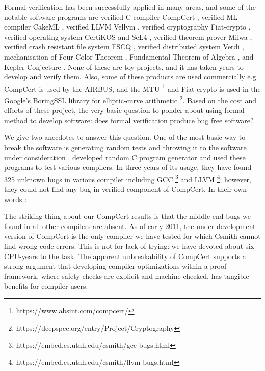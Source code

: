 	Formal verification has been successfully applied in many areas, and 
	some of the notable software programs are 
	verified C compiler CompCert \citep{DBLP:conf/popl/Leroy06}, verified ML compiler
	CakeML \citep{Kumar:2014:CVI}, verified LLVM 
	Vellvm \citep{10.1007/978-3-642-35308-6_6}, verified cryptography 
	Fiat-crypto \citep{DBLP:conf/sp/ErbsenPGSC19}, verified 
	operating system CertiKOS \citep{DBLP:conf/apsys/GuVFSC11} and 
	SeL4 \citep{DBLP:conf/sosp/KleinEHACDEEKNSTW09}, verified theorem 
	prover Milwa \citep{DBLP:conf/itp/MyreenD14}, 
	verified crash resistant file system FSCQ \citep{Chen:2015:UCH:2815400.2815402}, 
	verified distributed system 
	Verdi \citep{DBLP:conf/pldi/WilcoxWPTWEA15}, mechanisation of 
	Four Color Theorem \citep{10.1007/978-3-540-87827-8_28}, 
	Fundamental Theorem of 
	Algebra \citep{10.1007/3-540-45842-5_7}, and Kepler Conjecture \citep{hales-kepler}.
	None of these are toy projects, and it has taken years 
	to develop and verify them. Also, some of these products 
	are used commercially e.g CompCert is used by the AIRBUS, and the MTU
	\footnote{https://www.absint.com/compcert/} and Fiat-crypto is used 
	in the Google's BoringSSL library for elliptic-curve arithmetic 
	\footnote{https://deepspec.org/entry/Project/Cryptography}. 
	Based on the cost and efforts of these project, 
	the very basic question to ponder about using formal method to develop 
	software:  does formal verification produce bug free software?
	
	
	We give two anecdotes to answer this question. 
	One of the most basic way to 
	break the software is generating random tests and throwing it to 
	the software under consideration \citep{Miller:1990:ESR:96267.96279}.
	\citep{Yang:2011:FUB:1993316.1993532} developed random 
	C program generator and used these programs to test various 
	compilers. In three years of its usage, they have found 325 unknown
	bugs in various compiler including GCC
	\footnote{https://embed.cs.utah.edu/csmith/gcc-bugs.html} and LLVM
	\footnote{https://embed.cs.utah.edu/csmith/llvm-bugs.html}; however, 
	they could not find any bug in verified component of CompCert. 
	In their own words \citep{Yang:2011:FUB:1993316.1993532}:
	
	\begin{displayquote}
	
	The striking thing about our CompCert results is that the middle-end 
	bugs we found in all other compilers are absent. As of early 2011,
	the under-development version of CompCert is the only compiler we
	have tested for which Csmith cannot find wrong-code errors. This is
	not for lack of trying: we have devoted about six CPU-years to the
	task. The apparent unbreakability of CompCert supports a strong
	argument that developing compiler optimizations within a proof
	framework, where safety checks are explicit and machine-checked,
	has tangible benefits for compiler users.
	
	\end{displayquote}
	
